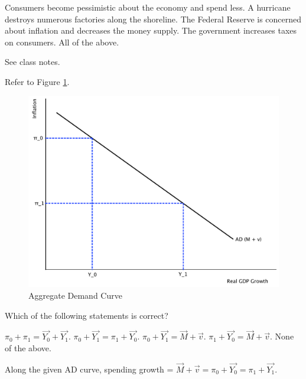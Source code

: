 \documentclass[addpoints,11pt]{exam}
\theoremstyle{definition}
\begin{document}
\begin{questions}
\begin{choices}
\choice Consumers become pessimistic about the economy and spend less.
\CorrectChoice A hurricane destroys numerous factories along the shoreline.
\choice The Federal Reserve is concerned about inflation and decreases the money supply.
\choice The government increases taxes on consumers.
\choice All of the above. 
\end{choices}

\newpage

\begin{solution}
See class notes.
\end{solution}

\question Refer to Figure \ref{fig2}.

\begin{figure}[h!]
	\centering
	\includegraphics[scale=.40]{plot95.pdf}
	\caption{Aggregate Demand Curve}
	\label{fig2}
\end{figure}

Which of the following statements is correct?

\begin{choices}
	\choice $\pi_0 + \pi_1 = \vec{Y_0} + \vec{Y_1}$.
	\choice $\pi_0 + \vec{Y_1} = \pi_1 + \vec{Y_0}$.
	\choice $\pi_0 + \vec{Y_1} = \vec{M} + \vec{v}$.
	\choice $\pi_1 + \vec{Y_0} = \vec{M} + \vec{v}$.
	\CorrectChoice None of the above.
\end{choices}

\begin{solution}
	Along the given AD curve, spending growth = $\vec{M} + \vec{v} = \pi_0 + \vec{Y_0} = \pi_1 + \vec{Y_1}$.
\end{solution}


\end{questions}
\end{document}
